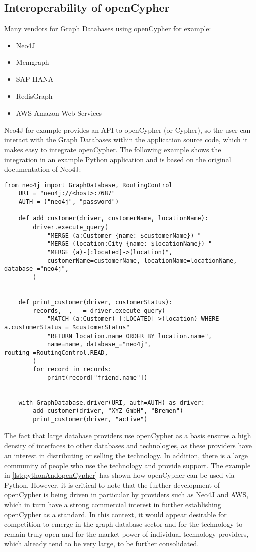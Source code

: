 \subsection{Interoperability of openCypher}
\label{subsec:different_query_languages_for_graph_databases:openCypher:interoperability}
Many vendors for Graph Databases using openCypher for example:
\begin{itemize}
	\item Neo4J
	\item Memgraph
	\item SAP HANA
	\item RedisGraph
	\item AWS Amazon Web Services
\end{itemize}
Neo4J for example provides an API to openCypher (or Cypher), so the user can interact
with the Graph Databases within the application source code, which it makes easy to 
integrate openCypher. The following example shows the integration in an example Python application
and is based on the original documentation of Neo4J:
\begin{lstlisting}[caption={Interact with Cypher via Python}, label={lst:pythonAndopenCypher}] 
	from neo4j import GraphDatabase, RoutingControl
	URI = "neo4j://<host>:7687"
	AUTH = ("neo4j", "password")
	
	def add_customer(driver, customerName, locationName):
		driver.execute_query(
			"MERGE (a:Customer {name: $customerName}) "
			"MERGE (location:City {name: $locationName}) "
			"MERGE (a)-[:located]->(location)",
			customerName=customerName, locationName=locationName, database_="neo4j",
		)


	def print_customer(driver, customerStatus):
		records, _, _ = driver.execute_query(
			"MATCH (a:Customer)-[:LOCATED]->(location) WHERE a.customerStatus = $customerStatus"
			"RETURN location.name ORDER BY location.name",
			name=name, database_="neo4j", routing_=RoutingControl.READ,
		)
		for record in records:
			print(record["friend.name"])


	with GraphDatabase.driver(URI, auth=AUTH) as driver:
		add_customer(driver, "XYZ GmbH", "Bremen")
		print_customer(driver, "active")
\end{lstlisting}
\newpage 
The fact that large database providers use openCypher as a basis ensures a high density of interfaces 
to other databases and technologies, 
as these providers have an interest in distributing or selling the technology. 
In addition, there is a large community of people who use the technology and provide support. 
The example in \cref{lst:pythonAndopenCypher} has shown how openCypher can be used via Python.\newline 
However, it is critical to note that the further development of openCypher 
is being driven in particular by providers such as Neo4J and AWS, 
which in turn have a strong commercial interest in further establishing openCypher as a standard.
In this context, it would appear desirable 
for competition to emerge in the graph database sector and for the technology 
to remain truly open and for the market 
power of individual technology providers, 
which already tend to be very large, to be further consolidated. 

